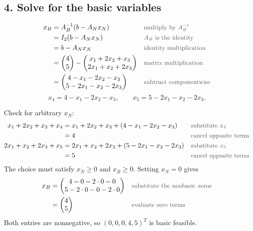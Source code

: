 \documentclass[a4paper,11pt]{article}
\newif\ifexplain
\newcommand{\teil}[1]{\subsection*{#1}}
\newcommand{\why}[1]{\text{\small\color{black!65}#1}}
\newcommand{\explain}[1]{\ifexplain\begin{erklbox}#1\end{erklbox}\fi}
\begin{document}
\teil{4. Solve for the basic variables}
\begin{align*}
x_B&=A_B^{-1}(b-A_Nx_N)&&\why{multiply by $A_B^{-1}$}\\
&=I_2(b-A_Nx_N)&&\why{$A_B$ is the identity}\\
&=b-A_Nx_N&&\why{identity multiplication}\\
&=\begin{pmatrix}4\cr5\end{pmatrix}-\begin{pmatrix}x_1+2x_2+x_3\cr2x_1+x_2+2x_3\end{pmatrix}&&\why{matrix multiplication}\\
&=\begin{pmatrix}4-x_1-2x_2-x_3\cr5-2x_1-x_2-2x_3\end{pmatrix}&&\why{subtract componentwise}
\end{align*}
\[\boxed{x_4=4-x_1-2x_2-x_3,\qquad x_5=5-2x_1-x_2-2x_3.}\]
\explain{Wir können rechts Werte für $x_1,x_2,x_3$ einsetzen und links die beiden übrigen Werte ablesen. Nicht jede Wahl ist zulässig. Auch $x_4$ und $x_5$ müssen mindestens null bleiben. Das unterscheidet eine Lösung der Gleichungen von einer zulässigen Lösung des LP. Wenn eine berechnete Schlupfvariable negativ wird, ist zwar die zugehörige Gleichung weiterhin erfüllt, aber die ursprüngliche obere Schranke wurde überschritten, weshalb wir diesen Punkt trotz korrekter Rechnung nicht verwenden dürfen.}
Check for arbitrary $x_N$:
\begin{align*}
x_1+2x_2+x_3+x_4&=x_1+2x_2+x_3+(4-x_1-2x_2-x_3)&&\why{substitute $x_4$}\\
&=4&&\why{cancel opposite terms}\\
2x_1+x_2+2x_3+x_5&=2x_1+x_2+2x_3+(5-2x_1-x_2-2x_3)&&\why{substitute $x_5$}\\
&=5&&\why{cancel opposite terms}
\end{align*}
The choice must satisfy $x_N\geq0$ and $x_B\geq0$. Setting $x_N=0$ gives
\begin{align*}
x_B&=\begin{pmatrix}4-0-2\cdot0-0\cr5-2\cdot0-0-2\cdot0\end{pmatrix}&&\why{substitute the nonbasic zeros}\\
&=\begin{pmatrix}4\cr5\end{pmatrix}&&\why{evaluate zero terms}
\end{align*}
Both entries are nonnegative, so $(0,0,0,4,5)^T$ is basic feasible.
\end{document}
